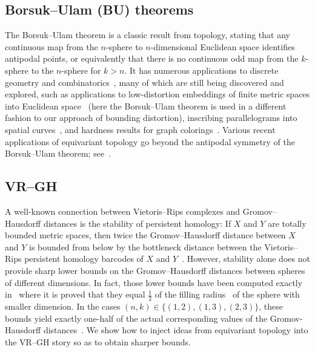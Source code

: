 \documentclass[11pt, reqno, english]{amsart}
\begin{document}
\subsection*{Borsuk--Ulam (BU) theorems}

The Borsuk--Ulam theorem is a classic result from topology, stating that any continuous map from the $n$-sphere to $n$-dimensional Euclidean space identifies antipodal points, or equivalently that there is no continuous odd map from the $k$-sphere to the $n$-sphere for $k>n$.
It has numerous applications to discrete geometry and combinatorics~\cite{matousek2003using}, many of which are still being discovered and explored, such as applications to low-distortion embeddings of finite metric spaces into Euclidean space~\cite{sidiropoulos2019} (here the Borsuk--Ulam theorem is used in a different fashion to our approach of bounding distortion), inscribing parallelograms into spatial curves~\cite{aslam2020}, and hardness results for graph colorings~\cite{austrin-bhangale-potukuchi2020}.
Various recent applications of equivariant topology go beyond the antipodal symmetry of the Borsuk--Ulam theorem; see~\cite{blagojevic2017}.


\subsection*{VR--GH}

A well-known connection between Vietoris--Rips complexes and Gromov--Hausdorff distances is the stability of persistent homology:
If $X$ and $Y$ are totally bounded metric spaces, then twice the Gromov--Hausdorff distance between $X$ and $Y$ is bounded from below by the bottleneck distance between the Vietoris--Rips persistent homology barcodes of $X$ and $Y$~\cite{ChazalDeSilvaOudot2014,chazal2009gromov,cohen2007stability}.
However, stability alone does not provide sharp lower bounds on the Gromov--Hausdorff distances between spheres of different dimensions. In fact, those lower bounds have been computed exactly in~\cite[Corollary 9.3]{lim2020vietoris} where it is proved that they equal $\frac{1}{2}$ of the filling radius~\cite{gromov1983filling,katz1983filling} of the sphere with smaller dimension.
In the cases $(n,k)\in\{(1,2),(1,3),(2,3)\}$, these bounds  yield exactly one-half of the actual corresponding values  of the Gromov-Hausdorff distances~\cite{lim2021gromov}.
We show how to inject ideas from equivariant topology into the VR--GH story so as to obtain sharper bounds.
\end{document}
